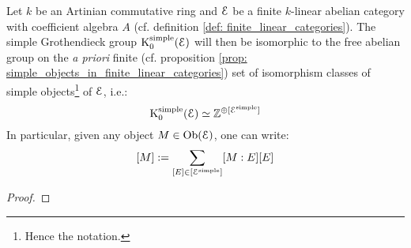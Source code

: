             \begin{proposition} \label{prop: simple_grothendieck_groups_of_finite_linear_abelian_categories_are_free_on_simple_objects} 
                Let $k$ be an Artinian commutative ring and $\mathcal{E}$ be a finite $k$-linear abelian category with coefficient algebra $A$ (cf. definition \ref{def: finite_linear_categories}). The simple Grothendieck group $\mathrm{K}_0^{\mathrm{simple}}(\mathcal{E})$ will then be isomorphic to the free abelian group on the \textit{a priori} finite (cf. proposition \ref{prop: simple_objects_in_finite_linear_categories}) set of isomorphism classes of simple objects\footnote{Hence the notation.} of $\mathcal{E}$, i.e.:
                    $$\mathrm{K}_0^{\mathrm{simple}}(\mathcal{E}) \simeq \mathbb{Z}^{\oplus [\mathcal{E}^{\mathrm{simple}}]}$$
                In particular, given any object $M \in \mathrm{Ob}(\mathcal{E})$, one can write:
                    $$[M] := \sum_{[E] \in [\mathcal{E}^{\mathrm{simple}}]} [M : E] [E]$$
            \end{proposition}
                \begin{proof}
                    
                \end{proof}
                

